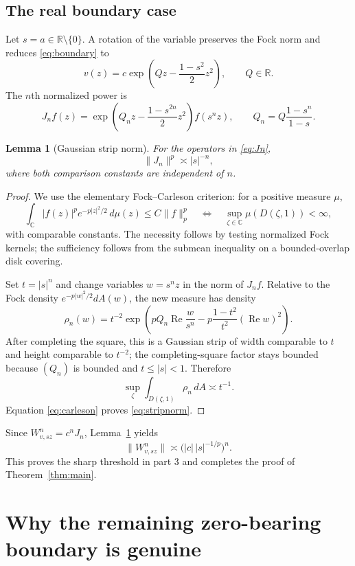 \documentclass[11pt]{article}
\newtheorem{lemma}{Lemma}
\newcommand{\C}{\mathbb C}
\begin{document}
\subsection*{The real boundary case}

Let $s=a\in\mathbb R\setminus\{0\}$.  A rotation of the variable preserves
the Fock norm and reduces \eqref{eq:boundary} to
\[
 v(z)=c\exp\!\left(Qz-\frac{1-s^2}{2}z^2\right),
 \qquad Q\in\mathbb R.
 \tag{7}\label{eq:canonical}
\]
The $n$th normalized power is
\[
 J_nf(z)=
 \exp\!\left(Q_nz-\frac{1-s^{2n}}2z^2\right)f(s^nz),
 \qquad Q_n=Q\frac{1-s^n}{1-s}.
 \tag{8}\label{eq:Jn}
\]

\begin{lemma}[Gaussian strip norm]\label{lem:strip}
For the operators in \eqref{eq:Jn},
\[
 \|J_n\|^p\asymp |s|^{-n},
 \tag{9}\label{eq:stripnorm}
\]
where both comparison constants are independent of $n$.
\end{lemma}

\begin{proof}
We use the elementary Fock--Carleson criterion: for a positive measure $\mu$,
\[
 \int_{\C}|f(z)|^pe^{-p|z|^2/2}\,d\mu(z)\le C\|f\|_p^p
 \quad\Longleftrightarrow\quad
 \sup_{\zeta\in\C}\mu(D(\zeta,1))<\infty,
 \tag{10}\label{eq:carleson}
\]
with comparable constants.  The necessity follows by testing normalized
Fock kernels; the sufficiency follows from the submean inequality on a
bounded-overlap disk covering.

Set $t=|s|^n$ and change variables $w=s^nz$ in the norm of $J_nf$.  Relative
to the Fock density $e^{-p|w|^2/2}dA(w)$, the new measure has density
\[
 \rho_n(w)=t^{-2}\exp\!\left(
 pQ_n\operatorname{Re}\frac{w}{s^n}
 -p\frac{1-t^2}{t^2}(\operatorname{Re}w)^2
 \right).
 \tag{11}\label{eq:density}
\]
After completing the square, this is a Gaussian strip of width comparable to
$t$ and height comparable to $t^{-2}$; the completing-square factor stays
bounded because $(Q_n)$ is bounded and $t\le|s|<1$.  Therefore
\[
 \sup_{\zeta}\int_{D(\zeta,1)}\rho_n\,dA\asymp t^{-1}.
\]
Equation \eqref{eq:carleson} proves \eqref{eq:stripnorm}.
\end{proof}

Since $W_{v,sz}^n=c^nJ_n$, Lemma~\ref{lem:strip} yields
\[
 \|W_{v,sz}^n\|\asymp
 \bigl(|c|\,|s|^{-1/p}\bigr)^n.
 \tag{12}\label{eq:growth}
\]
This proves the sharp threshold in part 3 and completes the proof of
Theorem~\ref{thm:main}.

\section{Why the remaining zero-bearing boundary is genuine}
\end{document}
